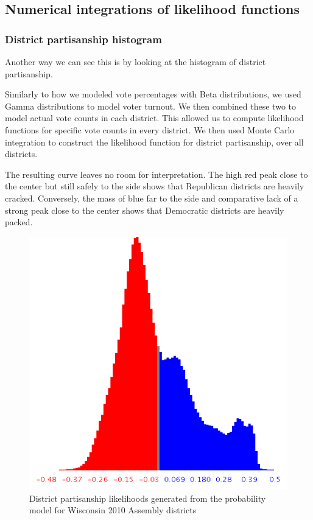 \documentclass[preprint,12pt]{article}
\begin{document}
\subsection{Numerical integrations of likelihood functions}
\subsubsection{District partisanship histogram}
 
Another way we can see this is by looking at the histogram of district partisanship.
 
Similarly to how we modeled vote percentages with Beta distributions, we used Gamma distributions to model voter turnout.  We then combined these two to model actual vote counts in each district.  This allowed us to compute likelihood functions for specific vote counts in every district.  We then used Monte Carlo integration to construct the likelihood function for district partisanship, over all districts.
 
The resulting curve leaves no room for interpretation.  The high red peak close to the center but still safely to the side shows that Republican districts are heavily cracked.  Conversely, the mass of blue far to the side and comparative lack of a strong peak close to the center shows that Democratic districts are heavily packed.
 
\begin{figure}[htb!]
    \begin{center}
        \includegraphics[scale=0.6]{../Figures/WI2010/district_partisan_likelihoods.png}
        \caption{District partisanship likelihoods generated from the probability model for Wisconsin 2010 Assembly districts}\label{fig:LikelihoodsDistrictPartisanship}
    \end{center}
\end{figure}
\end{document}
